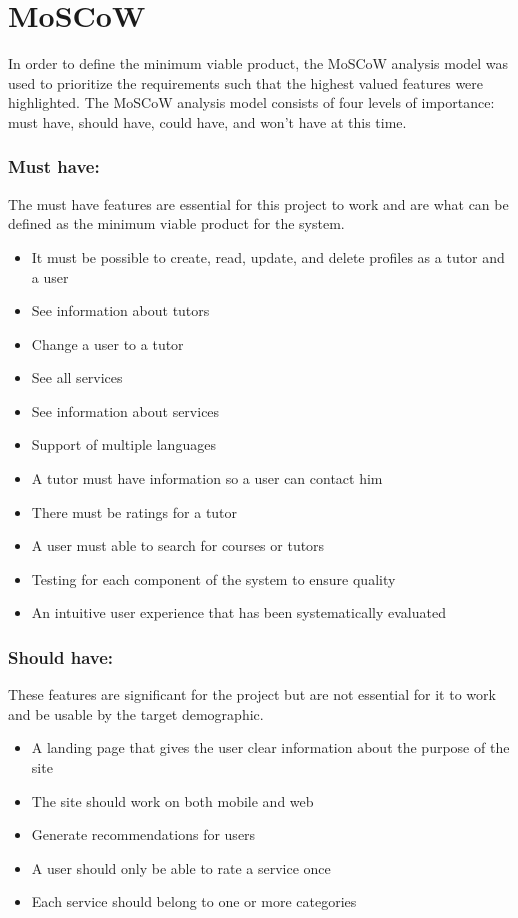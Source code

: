 \section{MoSCoW}
In order to define the minimum viable product, the MoSCoW analysis model was used to prioritize the requirements such that the highest valued features were highlighted.
The MoSCoW analysis model consists of four levels of importance: must have, should have, could have, and won't have at this time.

\subsubsection{Must have:}
The must have features are essential for this project to work and are what can be defined as the minimum viable product for the system.

\begin{itemize}
    \item It must be possible to create, read, update, and delete profiles as a tutor and a user
    \item See information about tutors
    \item Change a user to a tutor
    \item See all services
    \item See information about services
    \item Support of multiple languages
    \item A tutor must have information so a user can contact him
    \item There must be ratings for a tutor
    \item A user must able to search for courses or tutors
    \item Testing for each component of the system to ensure quality
    \item An intuitive user experience that has been systematically evaluated
\end{itemize}

\subsubsection{Should have:}
These features are significant for the project but are not essential for it to work and be usable by the target demographic.

\begin{itemize}
    \item A landing page that gives the user clear information about the purpose of the site
    \item The site should work on both mobile and web
    \item Generate recommendations for users
    \item A user should only be able to rate a service once
    \item Each service should belong to one or more categories
\end{itemize}

